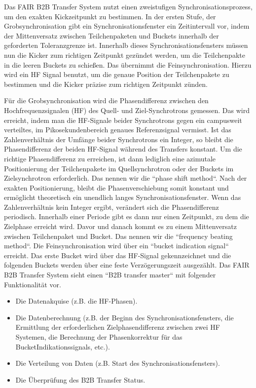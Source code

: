 Das FAIR B2B Transfer System nutzt einen zweistufigen Synchronisationsprozess, um den exakten Kickzeitpunkt zu bestimmen. In der ersten Stufe, der Grobsynchronisation gibt ein Synchronisationsfenster ein Zeitintervall vor, indem der Mittenversatz zwischen Teilchenpaketen und Buckets innerhalb der geforderten Toleranzgrenze ist. Innerhalb dieses Synchronisationsfensters m\"ussen nun die
Kicker zum richtigen Zeitpunkt gez\"undet werden, um die Teilchenpakte in die leeren Buckets zu schie\ss en. Das \"ubernimmt die Feinsynchronisation. Hierzu wird ein HF Signal benutzt, um die genaue Position der Teilchenpakete zu bestimmen und die Kicker pr\"azise zum richtigen Zeitpunkt z\"unden. 

F\"ur die Grobsynchronisation wird die Phasendifferenz zwischen den Hochfrequenzsignalen (HF) des Quell- und Ziel-Synchrotrons gemessen. Das wird erreicht, indem man die HF-Signale beider Synchrotrons gegen ein campusweit verteiltes, im Pikosekundenbereich genaues Referenzsignal vermisst. Ist das Zahlenverh\"altnis der Umf\"ange beider Synchrotrons ein Integer, so bleibt die Phasendifferenz der beiden HF-Signal w\"ahrend des Transfers konstant. Um die richtige Phasendifferenz zu erreichen, ist dann lediglich eine azimutale Positionierung der Teilchenpakete im Quellsynchrotron oder der Buckets im Zielsynchrotron erforderlich. Das nennen wir die ``phase shift method``. Nach der exakten Positionierung, bleibt die Phasenverschiebung somit konstant und erm\"oglicht theoretisch ein unendlich langes Synchronisationsfenster. Wenn das Zahlenverh\"altnis kein Integer ergibt, ver\"andert sich die Phasendifferenz periodisch. Innerhalb einer Periode gibt es dann nur einen Zeitpunkt, zu dem die Zielphase erreicht wird. Davor und danach kommt es zu einem Mittenversatz zwischen Teilchenpaket und Bucket. Das nennen wir die ``frequency beating method``. Die Feinsynchronisation wird \"uber ein ``bucket indication signal`` erreicht. Das erste
Bucket wird \"uber das HF-Signal gekennzeichnet und die folgenden Buckets werden \"uber eine feste Verz\"ogerungszeit ausgez\"ahlt.
Das FAIR B2B Transfer System sieht einen ``B2B transfer master`` mit folgender Funktionalit\"at vor.
\begin{itemize}

\item Die Datenakquise (z.B. die HF-Phasen).
\item Die Datenberechnung (z.B. der Beginn des Synchronisationsfensters, die Ermittlung der erforderlichen Zielphasendifferenz zwischen zwei HF Systemen, die Berechnung der Phasenkorrektur f\"ur das BucketIndikationssignals,
etc.).
\item Die Verteilung von Daten (z.B. Start des Synchronisationsfensters).
\item Die \"Uberpr\"ufung des B2B Transfer Status.
\end{itemize}


